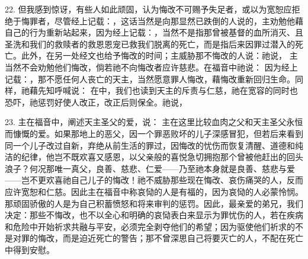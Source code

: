 22. 但我感到惊讶，有些人如此顽固，认为悔改不可赐予失足者，或以为宽恕应拒绝于悔罪者，尽管经上记载：，这话当然是向那显然已跌倒的人说的，主劝勉他藉自己的行为重新站起来，因为经上记载：，当然不是指那曾被基督的血所消灭、且圣洗和我们的救赎者的救恩恩宠已救我们脱离的死亡，而是指后来因罪过潜入的死亡。此外，在另一处经文也给予悔改的时间；主威胁那不悔改的人说：祂说， 主当然不会劝勉他们悔改，倘若祂不向悔改者应许慈悲。在福音中祂说： 因为经上记载：，那不愿任何人丧亡的天主，当然愿意罪人悔改，藉悔改重新回归生命。同样，祂藉先知呼喊说： 在中，我们也读到天主的斥责与仁慈，祂在宽容的同时也恐吓，祂惩罚好使人改正，改正后则保全。祂说，\par

23. 主在福音中，阐述天主圣父的爱，说： 主在这里比较血肉之父和天主圣父永恒而慷慨的爱。如果那地上的恶父，因一个罪恶败坏的儿子深感冒犯，但若后来看到同一个儿子改过自新，弃绝从前生活的罪过，因悔改的忧伤而恢复清醒、道德和纯洁的纪律，他岂不既欢喜又感恩，以父亲般的喜悦急切拥抱那个曾被他赶出的回头浪子？何况那唯一真父，良善、慈悲、仁爱——乃至祂本身就是良善、慈悲与爱——岂不更欢喜祂自己儿子的悔改！祂不威胁那些现在悔改、哀伤痛哭的人，反而应许宽恕和仁慈。因此主在福音中称哀恸的人是有福的，因为哀恸的人必蒙怜悯。那顽固骄傲的人是为自己积蓄愤怒和将来审判的惩罚。因此，最亲爱的弟兄，我们决定：那些不悔改，也不以全心和明确的哀恸表白来显示为罪忧伤的人，若在疾病和危险中开始祈求共融与平安，必须完全剥夺他们的希望；因为驱使他们祈求的不是对罪的悔改，而是迫近死亡的警告；那不曾深思自己将要灭亡的人，不配在死亡中得到安慰。\par

